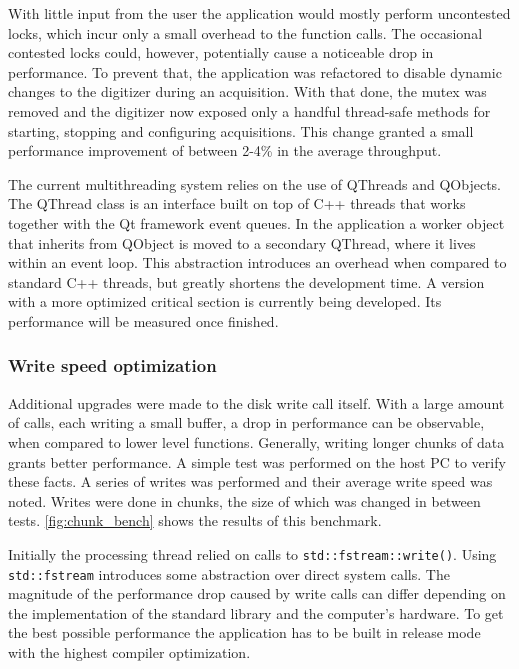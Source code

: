 With little input from the user the application would mostly perform
uncontested locks, which incur only a small overhead to the function calls.
The occasional contested locks could, however,
potentially cause a noticeable drop in performance.
To prevent that, the application was refactored to disable dynamic changes
to the digitizer during an acquisition. With that done, the mutex was removed
and the digitizer now exposed only a handful thread-safe methods for
starting, stopping and configuring acquisitions.
This change granted a small performance improvement of between 2-4\%
in the average throughput.


The current multithreading system relies on the use of QThreads and QObjects.
The QThread class is an interface built on top of C++ threads that 
works together with the Qt framework event queues.
In the application a worker object
that inherits from QObject is moved to a secondary QThread,
where it lives within an event loop.
This abstraction introduces an overhead when compared
to standard C++ threads, but greatly shortens the development time.
A version with a more optimized critical section is currently being developed.
Its performance will be measured once finished.

\subsubsection{Write speed optimization}

Additional upgrades were made to the disk write call itself. 
With a large amount of calls, each writing a small buffer, a drop in performance 
can be observable, when compared to lower level functions. Generally, writing 
longer chunks of data grants better performance. A simple test was performed
on the host PC to verify these facts. A series of writes was performed 
and their average write speed was noted. 
Writes were done in chunks, the size of which was changed in between tests.
\autoref{fig:chunk_bench} shows the results of this benchmark.


Initially the processing thread relied on calls to \lstinline{std::fstream::write()}.
Using \lstinline{std::fstream} introduces some abstraction over direct system calls.
The magnitude of the performance drop caused by write calls can differ 
depending on the implementation of the standard library and the computer's hardware.
To get the best possible performance the application has to be built
in release mode with the highest compiler optimization.


